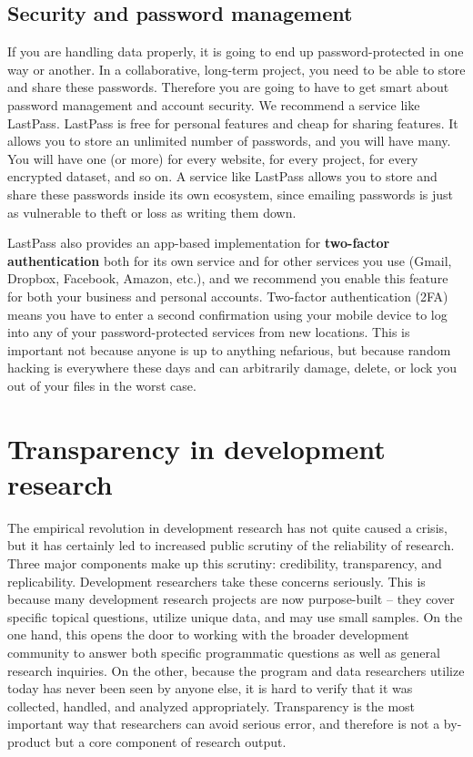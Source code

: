 \subsection{Security and password management}

If you are handling data properly, it is going to end up password-protected in one way or another.
In a collaborative, long-term project, you need to be able to store and share these passwords.
Therefore you are going to have to get smart about password management and account security.
We recommend a service like LastPass.
LastPass is free for personal features and cheap for sharing features.
It allows you to store an unlimited number of passwords, and you will have many.
You will have one (or more) for every website, for every project, for every encrypted dataset, and so on.
A service like LastPass allows you to store and share these passwords inside its own ecosystem,
since emailing passwords is just as vulnerable to theft or loss as writing them down.

LastPass also provides an app-based implementation for \textbf{two-factor authentication}
both for its own service and for other services you use (Gmail, Dropbox, Facebook, Amazon, etc.),
and we recommend you enable this feature for both your business and personal accounts.
Two-factor authentication (2FA) means you have to enter a second confirmation using your mobile device
to log into any of your password-protected services from new locations.
This is important not because anyone is up to anything nefarious,
but because random hacking is everywhere these days
and can arbitrarily damage, delete, or lock you out of your files in the worst case.


\section{Transparency in development research}

The empirical revolution in development research has not quite caused a crisis,
but it has certainly led to increased public scrutiny of the reliability of research.\cite{rogers_2017}
Three major components make up this scrutiny: credibility,\cite{ioannidis2017power} transparency,\cite{christensen2018transparency} and replicability.\cite{duvendack2017meant}
Development researchers take these concerns seriously.
This is because many development research projects are now purpose-built --
they cover specific topical questions, utilize unique data, and may use small samples.
On the one hand, this opens the door to working with the broader development community
to answer both specific programmatic questions as well as general research inquiries.
On the other, because the program and data researchers utilize today has never been seen by anyone else,
it is hard to verify that it was collected, handled, and analyzed appropriately.
Transparency is the most important way that researchers can avoid serious error,
and therefore is not a by-product but a core component of research output.

